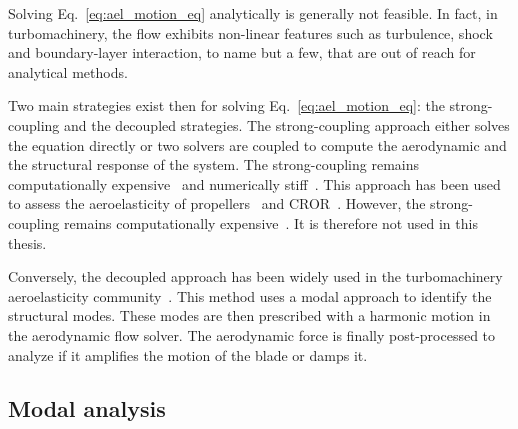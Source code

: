 
Solving Eq.~\eqref{eq:ael_motion_eq} analytically is generally 
not feasible. In fact, in turbomachinery, 
the flow exhibits non-linear features such as turbulence, shock and
boundary-layer interaction, to name but a few, that are out of reach for
analytical methods.

Two main strategies exist then for solving Eq.~\eqref{eq:ael_motion_eq}:
the strong-coupling and the decoupled strategies. The strong-coupling 
approach either solves the equation directly or two solvers are coupled to 
compute the aerodynamic and the structural response of the system.
The strong-coupling remains computationally expensive~\cite{Bartels2007}
and numerically stiff~\cite{Datta2008}. This approach
has been used to assess the
aeroelasticity of propellers~\cite{Ruiz-Calavera2012} and
CROR~\cite{Laban2010}. However, 
the strong-coupling remains 
computationally expensive~\cite{Bartels2007}.
It is therefore not used in this thesis.

Conversely, the decoupled approach has been widely used
in the turbomachinery aeroelasticity community~\cite{Marshall1996}.
This method uses a modal approach to identify the structural modes.
These modes are then prescribed with a harmonic motion in the aerodynamic
flow solver. The aerodynamic force is finally post-processed to 
analyze if it amplifies the motion of the blade or damps it.

\subsection{Modal analysis}
\label{sub:modal_analysis}

